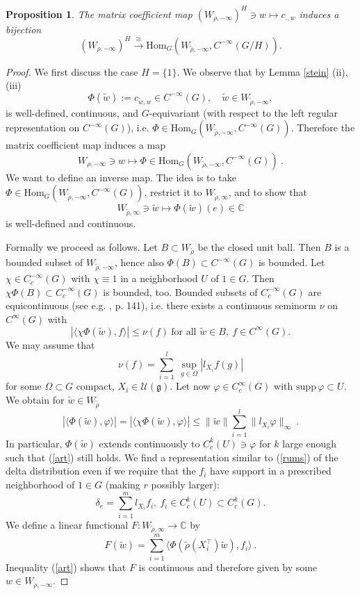 \documentclass[10]{amsart}
\newtheorem{pro}[thm]{Proposition}
\theoremstyle{remark}
\theoremstyle{definition}
\numberwithin{equation}{section}
\newcommand{\C}{\mathbb{C}}           %
\newcommand{\Hom}{\mathrm{Hom}}
\newcommand{\supp}{\mathrm{supp}}
\newcommand{\fg}{{\mathfrak g}}
\newcommand{\vp}{\varphi}
\newcommand{\Cal}{\mathcal}
\newcommand{\be}{\begin{equation}}
\begin{document}
{\begin{pro}\label{kunst}
The matrix coefficient map
$  (W_{\rho,-\infty})^H\ni w\mapsto c_{.,w} $
induces a bijection
$$  (W_{\rho,-\infty})^H\stackrel{\cong}{\longrightarrow} \Hom_G(W_{\tilde\rho,-\infty},C^{-\infty}(G/H)) .$$
\end{pro}
\begin{proof}
We first discuss the case $H=\{1\}$. We observe that by Lemma \ref{stein} (ii), (iii)
$$ \Phi(\tilde w):=c_{\tilde w,w}\in C^{-\infty}(G), \quad \tilde w\in W_{\tilde\rho, -\infty},$$
is well-defined, continuous, and $G$-equivariant (with respect to the left regular representation on  $C^{-\infty}(G)$), i.e. $\Phi\in \Hom_G(W_{\tilde\rho,-\infty},C^{-\infty}(G))$.
Therefore the matrix coefficient map induces a map
$$ W_{\rho,-\infty}\ni w\mapsto \Phi\in \Hom_G(W_{\tilde\rho,-\infty},C^{-\infty}(G))\ .$$
We want to define an inverse map. The idea is to take $\Phi\in \Hom_G(W_{\tilde\rho,-\infty},C^{-\infty}(G))$, restrict it to $W_{\tilde\rho,\infty}$,  and to show
that 
$$W_{\tilde\rho,\infty}\ni \tilde w\mapsto \Phi(\tilde w)(e)\in\C$$
is well-defined and continuous.

Formally we proceed as follows. Let $B\subset W_{\tilde\rho}$ be the closed unit ball. Then $B$ is a bounded subset of $W_{\tilde\rho,-\infty}$, hence also $\Phi(B)\subset C^{-\infty}(G)$
is bounded. Let $\chi\in C^{-\infty}_c(G)$ with $\chi\equiv 1$ in a neighborhood $U$ of $1\in G$. Then $\chi\Phi(B)\subset  C^{-\infty}_c(G)$ is bounded, too.
Bounded subsets of $C^{-\infty}_c(G)$ are equicontinuous (see e.g. \cite{Sch71}, p. 141), i.e. there exists a continuous seminorm $\nu$ on $C^\infty(G)$ with
$$|\langle \chi\Phi(\tilde w),f\rangle|\le \nu(f)\ \mbox{for all }\tilde w\in B,\ f\in C^\infty(G).$$
We may assume that 
$$\nu(f)=\sum_{i=1}^{l} \ \sup_{g\in\Omega}|l_{X_i} f(g)|$$
for some $\Omega\subset G$ compact, $X_i\in {\Cal U}(\fg)$. Let now $\vp\in C_c^\infty(G)$ with $\supp\, \vp\subset U$. We obtain for $\tilde w\in W_{\tilde \rho}$
\begin{equation}
\label{art}
|\langle \Phi(\tilde w),\vp\rangle| = |\langle \chi\Phi(\tilde w),\vp\rangle| \le \|\tilde w\| \sum_{i=1}^{l} \|l_{X_i} \vp\|_\infty\ .
\end{equation}
In particular, $\Phi(\tilde w)$ extends continuously to $C^k_c (U)\ni\vp$ for $k$ large enough such that (\ref{art}) still holds. We find a representation similar to (\ref{rums}) of the delta distribution
even if we require that the $f_i$ have support in a prescribed neighborhood of $1\in G$ (making $r$ possibly larger):
$$  \delta_e=\sum_{i=1}^m l_{X_i}f_i,\  f_i\in C^k_c(U)\subset C^k_c(G). $$
We define a linear functional $F: W_{\tilde \rho, \infty}\rightarrow \C$ by
\be \label{gnu} F(\tilde w)= \sum_{i=1}^m \langle \Phi(\tilde\rho(X_i^\top)\tilde w), f_i\rangle\ .
\end{equation}
Inequality (\ref{art}) shows that $F$ is continuous and therefore given by some $w\in W_{\rho,-\infty}$.


\end{proof}}
\end{document}
